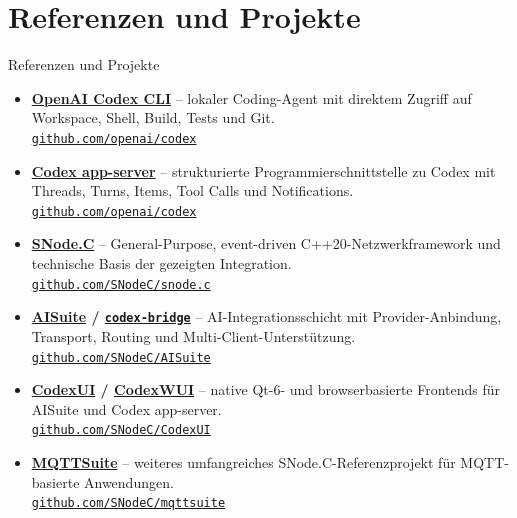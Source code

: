\documentclass[\fhformat,10pt]{fh-ooe}
\newcommand{\SNodeCLink}{\href{https://github.com/SNodeC/snode.c}{SNode.C}}
\newcommand{\AISuiteLink}{\href{https://github.com/SNodeC/AISuite}{AISuite}}
\newcommand{\CodexBridgeLink}{\href{https://github.com/SNodeC/AISuite}{\texttt{codex-bridge}}}
\newcommand{\CodexUILink}{\href{https://github.com/SNodeC/CodexUI}{CodexUI}}
\newcommand{\CodexWUILink}{\href{https://github.com/SNodeC/CodexUI}{CodexWUI}}
\newcommand{\MQTTSuiteLink}{\href{https://github.com/SNodeC/mqttsuite}{MQTTSuite}}
\begin{document}
\section{Referenzen und Projekte}
\begin{frame}{Referenzen und Projekte}
\small
\begin{itemize}
  \item \textbf{\href{https://github.com/openai/codex}{OpenAI Codex CLI}} -- lokaler Coding-Agent mit direktem Zugriff auf Workspace, Shell, Build, Tests und Git.\\[-0.05em]
        \href{https://github.com/openai/codex}{\texttt{github.com/openai/codex}}
  \item \textbf{\href{https://github.com/openai/codex}{Codex app-server}} -- strukturierte Programmierschnittstelle zu Codex mit Threads, Turns, Items, Tool Calls und Notifications.\\[-0.05em]
        \href{https://github.com/openai/codex}{\texttt{github.com/openai/codex}}
  \item \textbf{\SNodeCLink} -- General-Purpose, event-driven C++20-Netzwerkframework und technische Basis der gezeigten Integration.\\[-0.05em]
        \href{https://github.com/SNodeC/snode.c}{\texttt{github.com/SNodeC/snode.c}}
  \item \textbf{\AISuiteLink{} / \CodexBridgeLink} -- AI-Integrationsschicht mit Provider-Anbindung, Transport, Routing und Multi-Client-Unterstützung.\\[-0.05em]
        \href{https://github.com/SNodeC/AISuite}{\texttt{github.com/SNodeC/AISuite}}
  \item \textbf{\CodexUILink{} / \CodexWUILink} -- native Qt-6- und browserbasierte Frontends für AISuite und Codex app-server.\\[-0.05em]
        \href{https://github.com/SNodeC/CodexUI}{\texttt{github.com/SNodeC/CodexUI}}
  \item \textbf{\MQTTSuiteLink} -- weiteres umfangreiches SNode.C-Referenzprojekt für MQTT-basierte Anwendungen.\\[-0.05em]
        \href{https://github.com/SNodeC/mqttsuite}{\texttt{github.com/SNodeC/mqttsuite}}
\end{itemize}
\end{frame}
\end{document}
